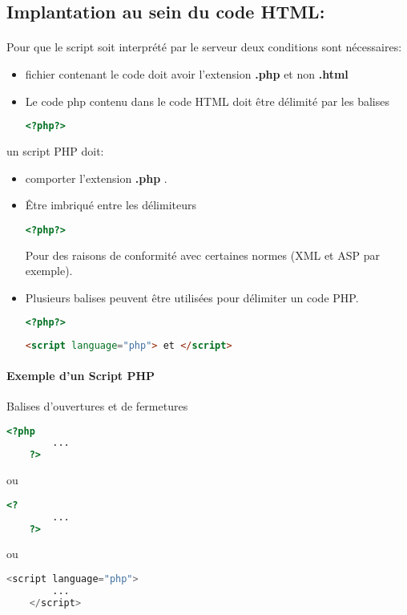 \subsection{Implantation au sein du code HTML:}
\paragraph{}
Pour que le script soit interprété par le serveur deux conditions sont
nécessaires:
\begin{itemize}
	\item  fichier contenant le code doit avoir l'extension \textbf{.php} et non \textbf{.html}
	\item 	Le code php contenu dans le code HTML doit être délimité par
	les balises
	 \begin{lstlisting}[language=html]
	 <?php?>
	 \end{lstlisting}
\end{itemize}
un script PHP doit:
\begin{itemize}
	\item comporter l'extension \textbf{.php} .
	\item Être imbriqué entre les délimiteurs
	\begin{lstlisting}[language=html]
	<?php?>
	\end{lstlisting}
	 Pour des raisons de conformité avec certaines normes (XML et ASP par exemple).
	 \item Plusieurs balises peuvent être utilisées pour délimiter un code PHP.
	\begin{lstlisting}[language=html]
		<?php?>
	\end{lstlisting}
	\begin{lstlisting}[language=html]
		<script language="php"> et </script>
	\end{lstlisting}
\end{itemize}

\paragraph{Exemple d'un Script PHP}
 Balises d'ouvertures et de fermetures
\begin{lstlisting}[language=php]
	<?php 
		...
	?>
\end{lstlisting}
 ou 
\begin{lstlisting}[language=php]
	<? 
		...
	?>
\end{lstlisting} 
ou 
\begin{lstlisting}[language=php]
	<script language="php">
		...
	</script>
\end{lstlisting}


